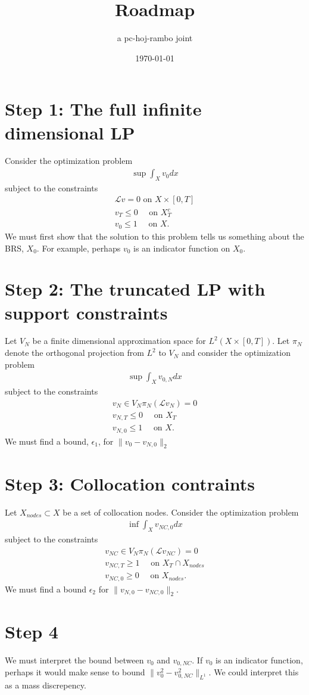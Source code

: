 \documentclass[12pt]{amsart}
\title{Roadmap}
\author{a pc-hoj-rambo joint}
\date{\today}
\begin{document}
\maketitle

\section{Step 1:  The full infinite dimensional LP}
Consider the optimization problem
\begin{align*}
	\sup \int_X v_0 dx
\end{align*}
subject to the constraints
\begin{align*}
	\mathcal{L}v = 0 \text{ on } X \times [0,T]\\
	v_T \leq 0 \quad \text{ on } X_T^c \\
	v_0 \leq 1 \quad \text{ on } X.
\end{align*}
We must first show that the solution to this problem tells us something about the BRS, $X_0$.  For example, perhaps $v_0$ is an indicator function on $X_0$.

\section{Step 2: The truncated LP with support constraints}
Let $V_N$ be a finite dimensional approximation space for $L^2( X \times [0,T])$.
Let $\pi_N$ denote the orthogonal projection from $L^2$ to $V_N$
and consider the optimization problem
\begin{align*}
	\sup \int_X v_{0,N} dx
\end{align*}
subject to the constraints
\begin{align*}
	v_N \in V_N
	\pi_N ( \mathcal{L} v_N ) = 0 \\
	v_{N,T} \leq 0 \quad \text{ on } X_T \\
	v_{N,0} \leq 1 \quad \text{ on } X.
\end{align*}
We must find a bound, $\epsilon_1$, for $\| v_0 - v_{N,0} \|_2$

\section{Step 3: Collocation contraints}
Let $X_{nodes} \subset X$ be a set of collocation nodes.
Consider the optimization problem
\begin{align*}
	\inf \int_X v_{NC,0} dx
\end{align*}
subject to the constraints
\begin{align*}
	v_{NC} \in V_N
	\pi_N ( \mathcal{L} v_{NC} ) = 0 \\
	v_{NC,T} \geq 1 \quad \text{ on } X_T \cap X_{nodes} \\
	v_{NC,0} \geq 0 \quad \text{ on } X_{nodes}.
\end{align*}
We must find a bound $\epsilon_2$ for $\| v_{N,0} - v_{NC,0} \|_2$.

\section{Step 4}
We must interpret the bound between $v_0$ and $v_{0,NC}$.
If $v_0$ is an indicator function, perhaps it would make sense to bound $\| v_0^2 - v^2_{0,NC} \|_{L^1}$.
We could interpret this as a mass discrepency.



\end{document}
